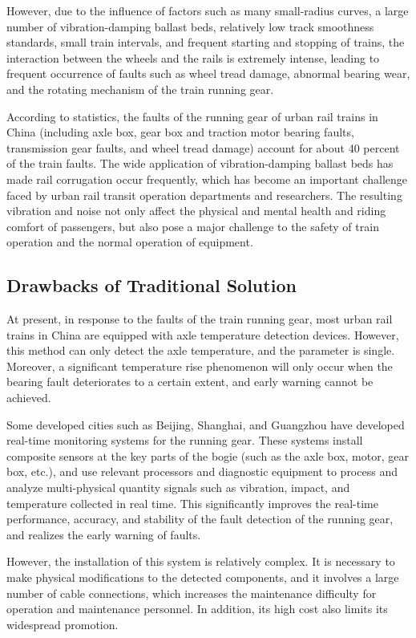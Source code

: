 \documentclass{article}
\begin{document}
However, due to the influence of factors such as many small-radius curves, a large number of vibration-damping ballast beds, relatively low track smoothness standards, small train intervals, and frequent starting and stopping of trains, the interaction between the wheels and the rails is extremely intense, leading to frequent occurrence of faults such as wheel tread damage, abnormal bearing wear, and the rotating mechanism of the train running gear. 

According to statistics, the faults of the running gear of urban rail trains in China (including axle box, gear box and traction motor bearing faults, transmission gear faults, and wheel tread damage) account for about 40 percent of the train faults. The wide application of vibration-damping ballast beds has made rail corrugation occur frequently, which has become an important challenge faced by urban rail transit operation departments and researchers. The resulting vibration and noise not only affect the physical and mental health and riding comfort of passengers, but also pose a major challenge to the safety of train operation and the normal operation of equipment.
\subsection{Drawbacks of Traditional Solution}
At present, in response to the faults of the train running gear, most urban rail trains in China are equipped with axle temperature detection devices. However, this method can only detect the axle temperature, and the parameter is single. Moreover, a significant temperature rise phenomenon will only occur when the bearing fault deteriorates to a certain extent, and early warning cannot be achieved. 

Some developed cities such as Beijing, Shanghai, and Guangzhou have developed real-time monitoring systems for the running gear. These systems install composite sensors at the key parts of the bogie (such as the axle box, motor, gear box, etc.), and use relevant processors and diagnostic equipment to process and analyze multi-physical quantity signals such as vibration, impact, and temperature collected in real time. This significantly improves the real-time performance, accuracy, and stability of the fault detection of the running gear, and realizes the early warning of faults. 

However, the installation of this system is relatively complex. It is necessary to make physical modifications to the detected components, and it involves a large number of cable connections, which increases the maintenance difficulty for operation and maintenance personnel. In addition, its high cost also limits its widespread promotion. 
\end{document}
